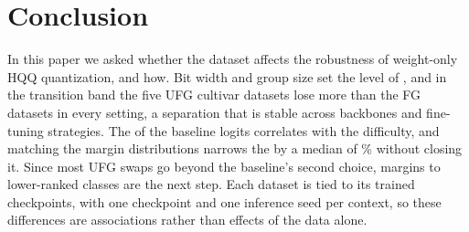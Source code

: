 \section{Conclusion}
\label{sec:conclusion}

In this paper we asked whether the dataset affects the robustness of weight-only HQQ quantization, and how.
Bit width and group size set the level of , and in the transition band the five UFG cultivar datasets lose more than the FG datasets in every setting, a separation that is stable across backbones and fine-tuning strategies.
The  of the baseline logits correlates with the difficulty, and matching the margin distributions narrows the  by a median of \% without closing it.
Since most UFG swaps go beyond the baseline's second choice, margins to lower-ranked classes are the next step.
Each dataset is tied to its trained checkpoints, with one checkpoint and one inference seed per context, so these differences are associations rather than effects of the data alone.
